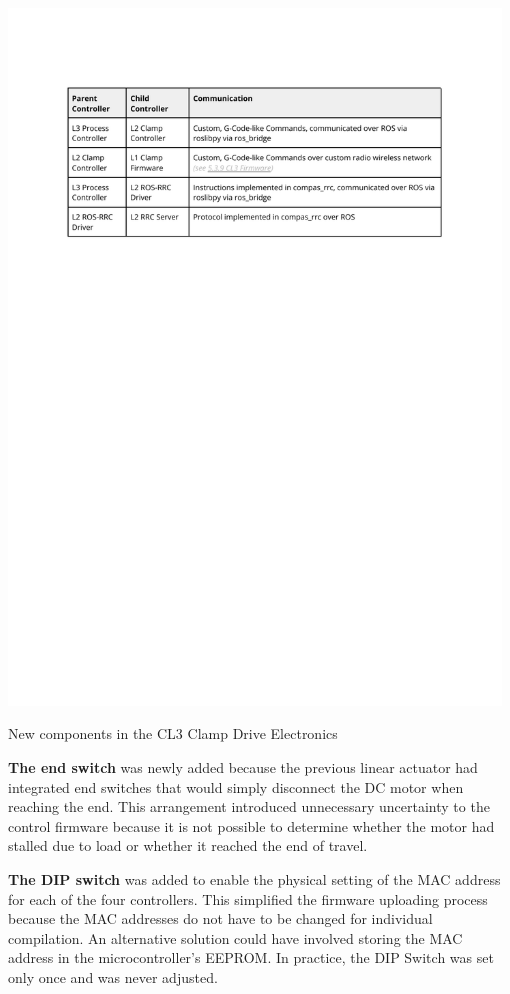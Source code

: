 \begin{table}
    \includegraphics[page=6, trim=25.4mm 185mm 25.4mm 33mm, clip, width=0.98\textwidth]{tables/Tables in Chapter 5.pdf}
    \caption{New components in the CL3 Clamp Drive Electronics}
    \label{table:cl3-clamp-electronics-components}
\end{table}

\textbf{The end switch} was newly added because the previous linear actuator had integrated end switches that would simply disconnect the DC motor when reaching the end. This arrangement introduced unnecessary uncertainty to the control firmware because it is not possible to determine whether the motor had stalled due to load or whether it reached the end of travel.

\textbf{The DIP switch} was added to enable the physical setting of the MAC address for each of the four controllers. This simplified the firmware uploading process because the MAC addresses do not have to be changed for individual compilation. An alternative solution could have involved storing the MAC address in the microcontroller's EEPROM. In practice, the DIP Switch was set only once and was never adjusted. 

